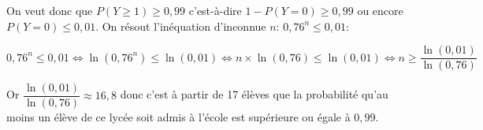 \begin{enumerate}
\begin{enumerate}
On veut donc que $P(Y\geqslant 1) \geqslant 0,99$ c'est-à-dire $1-P(Y=0) \geqslant 0,99$ ou encore\\ $P(Y=0) \leqslant 0,01$. On résout l'inéquation d'inconnue $n$: $0,76^n \leqslant 0,01$:		
		
$0,76^n \leqslant 0,01 \iff \ln\left (0,76^n\right ) \leqslant \ln\left (0,01\right )
\iff n \times \ln\left (0,76\right ) \leqslant \ln\left (0,01\right )
\iff n \geqslant \dfrac{\ln\left (0,01\right )}{\ln\left (0,76\right )}$

Or $\dfrac{\ln\left (0,01\right )}{\ln\left (0,76\right )}\approx 16,8$ donc c'est à partir de 17 élèves que la probabilité qu'au moins un élève de ce lycée soit admis à l'école est supérieure ou égale à $0,99$.
\end{enumerate}
\end{enumerate}

\bigskip
